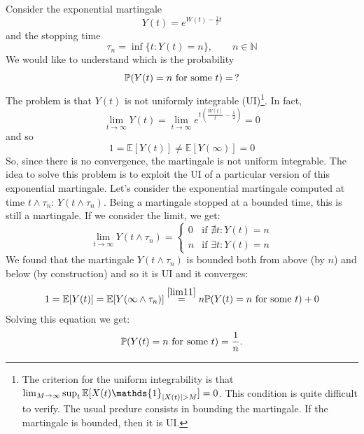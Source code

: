 \begin{example}{}{}{} %
    Consider the exponential martingale
    \begin{equation}
        Y(t)=e^{W(t)-\frac{1}{2}t}
    \end{equation}
    and the stopping time
    \begin{equation}
        \tau_n = \inf\{t:Y(t) = n\}, \qquad n\in\mathbb{N}
    \end{equation}
    We would like to understand which is the probability
    \begin{equation}
        \mathbb{P}(Y(t)=n \text{ for some } t) =\, ?
    \end{equation}
    The problem is that $Y(t)$ is not uniformly integrable (UI)\footnote{The criterion for the uniform integrability is that $\lim_{M\to\infty}\sup_{t}\mathbb{E}[X(t)\mathds{1}_{\abs{X(t)}>M}]=0$. This condition is quite difficult to verify. The usual predure consists in bounding the martingale. If the martingale is bounded, then it is UI.}. In fact, 
    \begin{equation*}
        \lim_{t\to\infty}Y(t) = \lim_{t\to\infty}e^{t\left(\frac{W(t)}{t}-\frac{1}{2}\right)} = 0
    \end{equation*}
    and so
    \begin{equation*}
        1 = \mathbb{E}[Y(t)] \ne \mathbb{E}[Y(\infty)] = 0
    \end{equation*}
    So, since there is no convergence, the martingale is not uniform integrable. The idea to solve this problem is to exploit the UI of a particular version of this exponential martingale. Let's consider the exponential martingale computed at time $t\wedge\tau_n$: $Y(t\wedge\tau_n)$. Being a martingale stopped at a bounded time, this is still a martingale. If we consider the limit, we get:
    \begin{equation}\label{lim11}
        \lim_{t\to\infty} Y(t\wedge\tau_n) = 
        \begin{cases}
        0 & \text{if } \nexists t : Y(t) = n \\
        n & \text{if } \exists t : Y(t) = n
        \end{cases}
    \end{equation}
    We found that the martingale $Y(t\wedge \tau_n)$ is bounded both from above (by $n$) and below (by construction) and so it is UI and it converges:
    \begin{equation*}
        1 = \mathbb{E}[Y(t)] = \mathbb{E}[Y(\infty\wedge\tau_n)] \overset{\eqref{lim11}}{=} n\mathbb{P}(Y(t)=n \text{ for some } t) + 0 
    \end{equation*}
    Solving this equation we get:
    \begin{equation}
        \mathbb{P}(Y(t)=n \text{ for some } t) = \frac{1}{n}.
    \end{equation}
\end{example}
